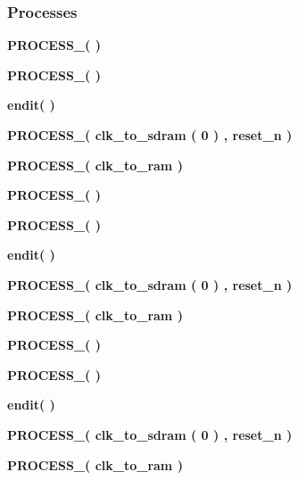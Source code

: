 \subsubsection*{Processes}
 \begin{DoxyCompactItemize}
\item 
{\bf P\+R\+O\+C\+E\+S\+S\+\_}{\bfseries  (  )}
\item 
{\bf P\+R\+O\+C\+E\+S\+S\+\_}{\bfseries  (  )}
\item 
{\bf endit}{\bfseries  (  )}
\item 
{\bf P\+R\+O\+C\+E\+S\+S\+\_}{\bfseries  ( {\bfseries {\bfseries {\bf clk\+\_\+to\+\_\+sdram}} \textcolor{vhdlchar}{(}\textcolor{vhdlchar}{ } \textcolor{vhdldigit}{0} \textcolor{vhdlchar}{)}\textcolor{vhdlchar}{ }} , {\bfseries {\bfseries {\bf reset\+\_\+n}} \textcolor{vhdlchar}{ }} )}
\item 
{\bf P\+R\+O\+C\+E\+S\+S\+\_}{\bfseries  ( {\bfseries {\bfseries {\bf clk\+\_\+to\+\_\+ram}} \textcolor{vhdlchar}{ }} )}
\item 
{\bf P\+R\+O\+C\+E\+S\+S\+\_}{\bfseries  (  )}
\item 
{\bf P\+R\+O\+C\+E\+S\+S\+\_}{\bfseries  (  )}
\item 
{\bf endit}{\bfseries  (  )}
\item 
{\bf P\+R\+O\+C\+E\+S\+S\+\_}{\bfseries  ( {\bfseries {\bfseries {\bf clk\+\_\+to\+\_\+sdram}} \textcolor{vhdlchar}{(}\textcolor{vhdlchar}{ } \textcolor{vhdldigit}{0} \textcolor{vhdlchar}{)}\textcolor{vhdlchar}{ }} , {\bfseries {\bfseries {\bf reset\+\_\+n}} \textcolor{vhdlchar}{ }} )}
\item 
{\bf P\+R\+O\+C\+E\+S\+S\+\_}{\bfseries  ( {\bfseries {\bfseries {\bf clk\+\_\+to\+\_\+ram}} \textcolor{vhdlchar}{ }} )}
\item 
{\bf P\+R\+O\+C\+E\+S\+S\+\_}{\bfseries  (  )}
\item 
{\bf P\+R\+O\+C\+E\+S\+S\+\_}{\bfseries  (  )}
\item 
{\bf endit}{\bfseries  (  )}
\item 
{\bf P\+R\+O\+C\+E\+S\+S\+\_}{\bfseries  ( {\bfseries {\bfseries {\bf clk\+\_\+to\+\_\+sdram}} \textcolor{vhdlchar}{(}\textcolor{vhdlchar}{ } \textcolor{vhdldigit}{0} \textcolor{vhdlchar}{)}\textcolor{vhdlchar}{ }} , {\bfseries {\bfseries {\bf reset\+\_\+n}} \textcolor{vhdlchar}{ }} )}
\item 
{\bf P\+R\+O\+C\+E\+S\+S\+\_}{\bfseries  ( {\bfseries {\bfseries {\bf clk\+\_\+to\+\_\+ram}} \textcolor{vhdlchar}{ }} )}

\end{DoxyCompactItemize}
